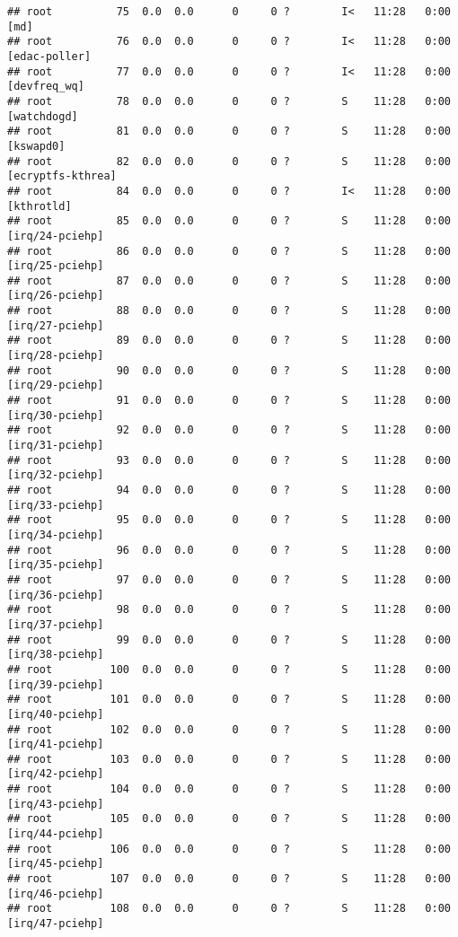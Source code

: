 \documentclass[]{article}
\begin{document}
\begin{verbatim}
## root          75  0.0  0.0      0     0 ?        I<   11:28   0:00 [md]
## root          76  0.0  0.0      0     0 ?        I<   11:28   0:00 [edac-poller]
## root          77  0.0  0.0      0     0 ?        I<   11:28   0:00 [devfreq_wq]
## root          78  0.0  0.0      0     0 ?        S    11:28   0:00 [watchdogd]
## root          81  0.0  0.0      0     0 ?        S    11:28   0:00 [kswapd0]
## root          82  0.0  0.0      0     0 ?        S    11:28   0:00 [ecryptfs-kthrea]
## root          84  0.0  0.0      0     0 ?        I<   11:28   0:00 [kthrotld]
## root          85  0.0  0.0      0     0 ?        S    11:28   0:00 [irq/24-pciehp]
## root          86  0.0  0.0      0     0 ?        S    11:28   0:00 [irq/25-pciehp]
## root          87  0.0  0.0      0     0 ?        S    11:28   0:00 [irq/26-pciehp]
## root          88  0.0  0.0      0     0 ?        S    11:28   0:00 [irq/27-pciehp]
## root          89  0.0  0.0      0     0 ?        S    11:28   0:00 [irq/28-pciehp]
## root          90  0.0  0.0      0     0 ?        S    11:28   0:00 [irq/29-pciehp]
## root          91  0.0  0.0      0     0 ?        S    11:28   0:00 [irq/30-pciehp]
## root          92  0.0  0.0      0     0 ?        S    11:28   0:00 [irq/31-pciehp]
## root          93  0.0  0.0      0     0 ?        S    11:28   0:00 [irq/32-pciehp]
## root          94  0.0  0.0      0     0 ?        S    11:28   0:00 [irq/33-pciehp]
## root          95  0.0  0.0      0     0 ?        S    11:28   0:00 [irq/34-pciehp]
## root          96  0.0  0.0      0     0 ?        S    11:28   0:00 [irq/35-pciehp]
## root          97  0.0  0.0      0     0 ?        S    11:28   0:00 [irq/36-pciehp]
## root          98  0.0  0.0      0     0 ?        S    11:28   0:00 [irq/37-pciehp]
## root          99  0.0  0.0      0     0 ?        S    11:28   0:00 [irq/38-pciehp]
## root         100  0.0  0.0      0     0 ?        S    11:28   0:00 [irq/39-pciehp]
## root         101  0.0  0.0      0     0 ?        S    11:28   0:00 [irq/40-pciehp]
## root         102  0.0  0.0      0     0 ?        S    11:28   0:00 [irq/41-pciehp]
## root         103  0.0  0.0      0     0 ?        S    11:28   0:00 [irq/42-pciehp]
## root         104  0.0  0.0      0     0 ?        S    11:28   0:00 [irq/43-pciehp]
## root         105  0.0  0.0      0     0 ?        S    11:28   0:00 [irq/44-pciehp]
## root         106  0.0  0.0      0     0 ?        S    11:28   0:00 [irq/45-pciehp]
## root         107  0.0  0.0      0     0 ?        S    11:28   0:00 [irq/46-pciehp]
## root         108  0.0  0.0      0     0 ?        S    11:28   0:00 [irq/47-pciehp]

\end{verbatim}
\end{document}
